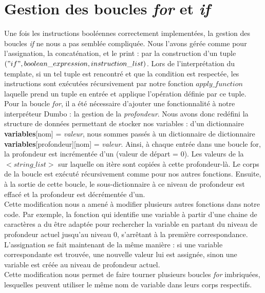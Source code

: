 \documentclass[11pt]{article}
\begin{document}
\section{Gestion des boucles \emph{for} et \emph{if}}
Une fois les instructions booléennes correctement implementées, la gestion des boucles \emph{if} ne nous a pas semblée compliquée. Nous l'avons gérée comme pour l'assignation, la concaténation, et le print : par la construction d'un tuple $("if",boolean\_ expression,instruction\_ list)$. Lors de l'interprétation du template, si un tel tuple est rencontré et que la condition est respectée, les instructions sont exécutées récursivement par notre fonction $apply\_ function$ laquelle prend un tuple en entrée et applique l'opération définie par ce tuple.\\[.5cm]
Pour la boucle \emph{for}, il a été nécessaire d'ajouter une fonctionnalité à notre interpréteur Dumbo : la gestion de la \emph{profondeur}. Nous avons donc redéfini la structure de données permettant de stocker nos variables : d'un dictionnaire \textbf{variables}[nom] = \emph{valeur}, nous sommes passés à un dictionnaire de dictionnaire \textbf{variables}[profondeur][nom] = \emph{valeur}.
Ainsi, à chaque entrée dans une boucle for, la profondeur est incrémentée d'un (valeur de départ = $0$). Les valeurs de la $<string\_ list>$ sur laquelle on itère sont copiées à cette profondeur-là. Le corps de la boucle est exécuté récursivement comme pour nos autres fonctions. Ensuite, à la sortie de cette boucle, le sous-dictionnaire à ce niveau de profondeur est effacé et la profondeur est décrémentée d'un.\\[.5cm]
Cette modification nous a amené à modifier plusieurs autres fonctions dans notre code. Par exemple, la fonction qui identifie une variable à partir d'une chaine de caractères a du être adaptée pour rechercher la variable en partant du niveau de profondeur actuel jusqu'au niveau 0, s'arrêtant à la première correspondance. L'assignation se fait maintenant de la même manière : si une variable correspondante est trouvée, une nouvelle valeur lui est assignée, sinon une variable est créée au niveau de profondeur actuel.\\[.5cm]
Cette modification nous permet de faire tourner plusieurs boucles \emph{for} imbriquées, lesquelles peuvent utiliser le même nom de variable dans leurs corps respectifs.

\newpage
\end{document}
